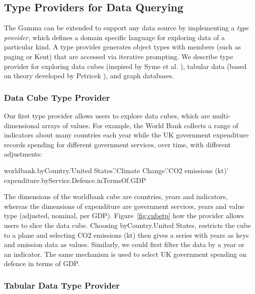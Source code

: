 \documentclass[manuscript,review,anonymous]{acmart}
\newcommand{\ikvd}[1]{{\fontfamily{zi4}\selectfont\small #1}}
\begin{document}
\subsection{Type Providers for Data Querying}
\label{sec:overview-tps}

The Gamma can be extended to support any data source by implementing a \emph{type provider},
which defines a domain specific language for exploring data of a particular kind.
A type provider generates object types with members (such as \ikvd{paging} or \ikvd{Kent})
that are accessed via iterative prompting. We describe type provider for exploring data cubes
(inspired by Syme et al. \cite{inforich}), tabular data (based on theory developed
by Petricek \cite{dotdriven}), and graph databases.

\subsubsection*{Data Cube Type Provider}
Our first type provider allows users to explore data cubes, which are multi-dimensional
arrays of values. For example, the World Bank collects a range of indicators about many countries
each year while the UK government expenditure records spending for different government services,
over time, with different adjustments:

\begin{thegamma}
worldbank.byCountry.'United States'.'Climate Change'.'CO2 emissions (kt)'
expenditure.byService.Defence.inTermsOf.GDP
\end{thegamma}

\noindent
The dimensions of the \ikvd{worldbank} cube are countries, years and indicators, whereas the dimensions
of \ikvd{expenditure} are government services, years and value type (adjusted, nominal,
per GDP).  Figure~\ref{fig:cubetp} how the provider allows users to slice the data cube.
Choosing \ikvd{byCountry.\textquotesingle United States\textquotesingle},
restricts the cube to a plane and selecting \ikvd{\textquotesingle CO2 emissions (kt)\textquotesingle}
then gives a series with years as keys and emission data as values. Similarly, we could first filter the
data by a year or an indicator. The same mechanism is used to select UK government spending on
defence in terms of GDP.

\subsubsection*{Tabular Data Type Provider}
\end{document}
